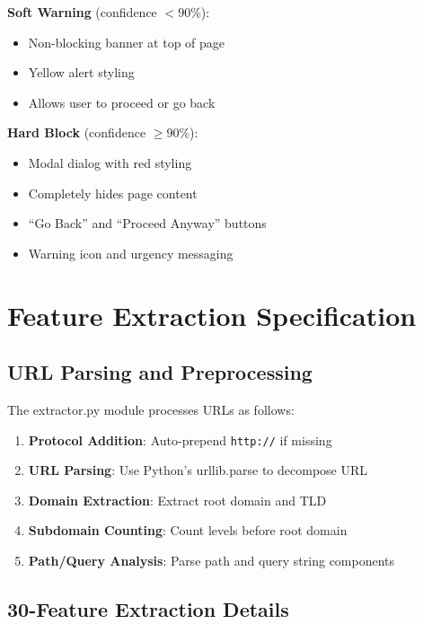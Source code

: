 \documentclass[12pt,a4paper]{report}
\begin{document}
\textbf{Soft Warning} (confidence $< 90\%$):
\begin{itemize}[leftmargin=*]
    \item Non-blocking banner at top of page
    \item Yellow alert styling
    \item Allows user to proceed or go back
\end{itemize}

\textbf{Hard Block} (confidence $\geq 90\%$):
\begin{itemize}[leftmargin=*]
    \item Modal dialog with red styling
    \item Completely hides page content
    \item ``Go Back'' and ``Proceed Anyway'' buttons
    \item Warning icon and urgency messaging
\end{itemize}

\chapter{Feature Extraction Specification}

\section{URL Parsing and Preprocessing}

The extractor.py module processes URLs as follows:

\begin{enumerate}[leftmargin=*]
    \item \textbf{Protocol Addition}: Auto-prepend \texttt{http://} if missing
    \item \textbf{URL Parsing}: Use Python's urllib.parse to decompose URL
    \item \textbf{Domain Extraction}: Extract root domain and TLD
    \item \textbf{Subdomain Counting}: Count levels before root domain
    \item \textbf{Path/Query Analysis}: Parse path and query string components
\end{enumerate}

\section{30-Feature Extraction Details}
\end{document}
